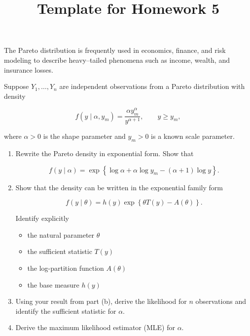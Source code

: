 \documentclass[12pt]{article}
\title{Template for Homework 5}
\author{}
\date{}
\begin{document}
\maketitle






The Pareto distribution is frequently used in economics, finance, and risk modeling to describe heavy–tailed phenomena such as income, wealth, and insurance losses.

Suppose $Y_1,\dots,Y_n$ are independent observations from a Pareto distribution with density

\[
f(y \mid \alpha, y_m)
=
\frac{\alpha y_m^\alpha}{y^{\alpha+1}},
\qquad y \ge y_m,
\]

where $\alpha>0$ is the shape parameter and $y_m>0$ is a known scale parameter.

\begin{enumerate}[label=(\alph*)]

\item Rewrite the Pareto density in exponential form. Show that

\[
f(y \mid \alpha)
=
\exp
\left\{
\log \alpha + \alpha \log y_m - (\alpha+1)\log y
\right\}.
\]

\item Show that the density can be written in the exponential family form

\[
f(y \mid \theta)
=
h(y)
\exp
\left\{
\theta T(y) - A(\theta)
\right\}.
\]

Identify explicitly

\begin{itemize}
\item the natural parameter $\theta$
\item the sufficient statistic $T(y)$
\item the log-partition function $A(\theta)$
\item the base measure $h(y)$
\end{itemize}

\item Using your result from part (b), derive the likelihood for $n$ observations and identify the sufficient statistic for $\alpha$.

\item Derive the maximum likelihood estimator (MLE) for $\alpha$.



\end{enumerate}

\newpage
\end{document}
